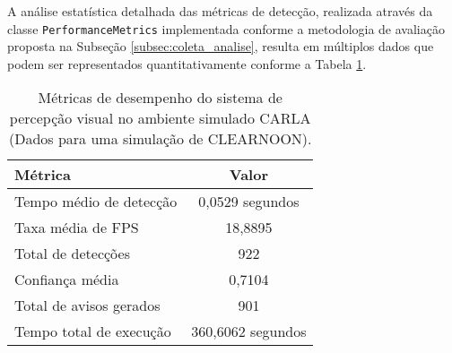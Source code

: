 

A análise estatística detalhada das métricas de detecção, realizada através da classe \texttt{PerformanceMetrics} implementada conforme a metodologia de avaliação proposta na Subseção \ref{subsec:coleta_analise}, resulta em múltiplos dados que podem ser representados quantitativamente conforme a Tabela \ref{tab:metricas_percepcao}.

\begin{table}[H]
\centering
\begin{tabular}{|l|c|}
\hline
\textbf{Métrica} & \textbf{Valor} \\
\hline
Tempo médio de detecção & 0,0529 segundos \\
\hline
Taxa média de FPS & 18,8895 \\
\hline
Total de detecções & 922 \\
\hline
Confiança média & 0,7104 \\
\hline
Total de avisos gerados & 901 \\
\hline
Tempo total de execução & 360,6062 segundos \\
\hline
\end{tabular}
\caption{Métricas de desempenho do sistema de percepção visual no ambiente simulado CARLA (Dados para uma simulação de CLEARNOON).}
\label{tab:metricas_percepcao}
\end{table}

